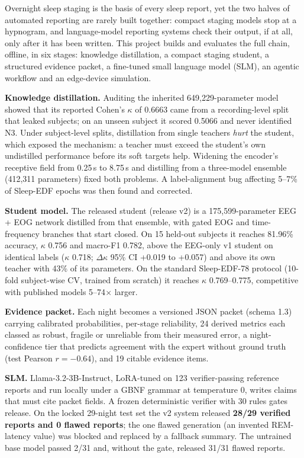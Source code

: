 Overnight sleep staging is the basis of every sleep report, yet the two halves of automated reporting are
rarely built together: compact staging models stop at a hypnogram, and language-model reporting systems check
their output, if at all, only after it has been written. This project builds and evaluates the full chain,
offline, in six stages: knowledge distillation, a compact staging student, a structured evidence packet, a
fine-tuned small language model (SLM), an agentic workflow and an edge-device simulation.

\textbf{Knowledge distillation.} Auditing the inherited 649,229-parameter model showed that its reported Cohen's
$\kappa$ of 0.6663 came from a recording-level split that leaked subjects; on an unseen subject it scored 0.5066
and never identified N3. Under subject-level splits, distillation from single teachers \emph{hurt} the student,
which exposed the mechanism: a teacher must exceed the student's own undistilled performance before its soft
targets help. Widening the encoder's receptive field from 0.25\,s to 8.75\,s and distilling from a three-model
ensemble (412,311 parameters) fixed both problems. A label-alignment bug affecting 5--7\% of Sleep-EDF epochs was
then found and corrected.

\textbf{Student model.} The released student (release v2) is a 175,599-parameter EEG + EOG network distilled
from that ensemble, with gated EOG and time-frequency branches that start closed. On 15 held-out subjects it
reaches 81.96\% accuracy, $\kappa$ 0.756 and macro-F1 0.782, above the EEG-only v1 student on identical labels
($\kappa$ 0.718; $\Delta\kappa$ 95\% CI +0.019 to +0.057) and above its own teacher with 43\% of its parameters.
On the standard Sleep-EDF-78 protocol (10-fold subject-wise CV, trained from scratch) it reaches $\kappa$
0.769--0.775, competitive with published models 5--74$\times$ larger.

\textbf{Evidence packet.} Each night becomes a versioned JSON packet (schema 1.3) carrying calibrated
probabilities, per-stage reliability, 24 derived metrics each classed as robust, fragile or unreliable from their
measured error, a night-confidence tier that predicts agreement with the expert without ground truth (test
Pearson $r=-0.64$), and 19 citable evidence items.

\textbf{SLM.} Llama-3.2-3B-Instruct, LoRA-tuned on 123 verifier-passing reference reports and run locally under a
GBNF grammar at temperature 0, writes claims that must cite packet fields. A frozen deterministic verifier with
30 rules gates release. On the locked 29-night test set the v2 system released \textbf{28/29 verified reports and
0 flawed reports}; the one flawed generation (an invented REM-latency value) was blocked and replaced by a
fallback summary. The untrained base model passed 2/31 and, without the gate, released 31/31 flawed reports.

